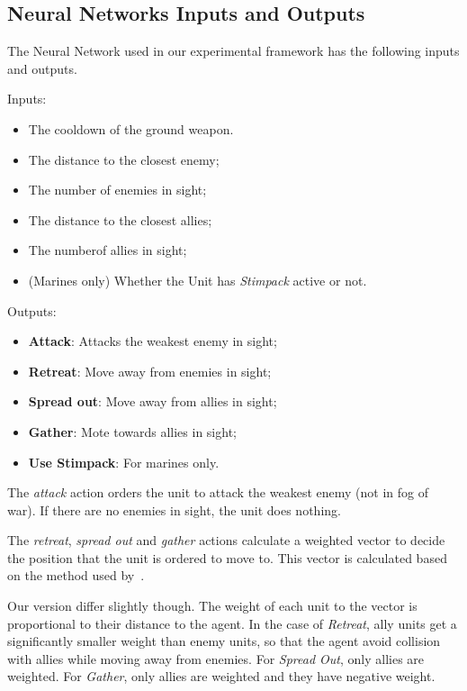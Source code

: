 \subsection{Neural Networks Inputs and Outputs}

The Neural Network used in our experimental framework has the
following inputs and outputs.

Inputs:
\begin{itemize}
    \item The cooldown of the ground weapon.
    \item The distance to the closest enemy;
    \item The number of enemies in sight;
    \item The distance to the closest allies;
    \item The numberof allies in sight;
    \item (Marines only) Whether the Unit has \emph{Stimpack} active or not.
\end{itemize}

Outputs:
\begin{itemize}
    \item {\bf Attack}: Attacks the weakest enemy in sight;
    \item {\bf Retreat}: Move away from enemies in sight;
    \item {\bf Spread out}: Move away from allies in sight;
    \item {\bf Gather}: Mote towards allies in sight;
    \item {\bf Use Stimpack}: For marines only.
\end{itemize}

The \emph{attack} action orders the unit to attack the weakest enemy
(not in fog of war). If there are no enemies in sight, the unit does
nothing.

The \emph{retreat}, \emph{spread out} and \emph{gather} actions
calculate a weighted vector to decide the position that the unit is
ordered to move to. This vector is calculated based on the method used
by~\cite{Shantia11ConnectionistSC, Wender12ReinforcementMicroSC,
  Zhen13NeuroEvoSC}.

Our version differ slightly though. The weight of each unit to the
vector is proportional to their distance to the agent. In the case of
\emph{Retreat}, ally units get a significantly smaller weight than
enemy units, so that the agent avoid collision with allies while
moving away from enemies. For \emph{Spread Out}, only allies are
weighted. For \emph{Gather}, only allies are weighted and they have
negative weight.


